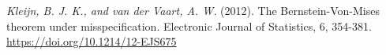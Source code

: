 \documentclass[../main.tex]{subfiles}
\begin{document}
\begin{thebibliography}{99}
	\textit{Kleijn, B. J. K., and van der Vaart, A. W.}  (2012). The Bernstein-Von-Mises theorem under misspecification. Electronic Journal of Statistics, 6, 354-381. \url{https://doi.org/10.1214/12-EJS675}

\end{thebibliography}
\end{document}
